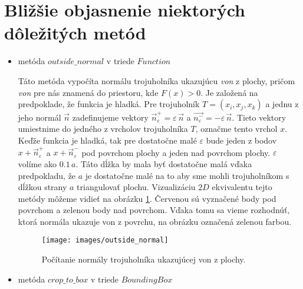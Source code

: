 \section{Bližšie objasnenie niektorých dôležitých metód}
\label{kap:important_methods}
\begin{itemize}
    \item{
        metóda $outside\_normal$ v triede $Function$
        
        Táto metóda vypočíta normálu trojuholníka ukazujúcu \textit{von} z plochy, 
        pričom \textit{von} pre nás znamená do priestoru, kde $F(x)>0$.
        Je založená na predpoklade, že funkcia je hladká. Pre trojuholník
        $T = (x_i, x_j, x_k)$ a jednu z jeho normál $\overrightarrow{n}$
        zadefinujeme vektory $\overrightarrow{n}_{\varepsilon}^+ = \varepsilon \, \overrightarrow{n}$
        a $\overrightarrow{n_{\varepsilon}^-} = - \varepsilon \, \overrightarrow{n}$.
        Tieto vektory umiestnime do jedného z vrcholov trojuholníka $T$, označme tento vrchol $x$.
        Keďže funkcia je hladká, tak pre dostatočne malé $\varepsilon$ bude jeden z
        bodov $x + \overrightarrow{n}_{\varepsilon}^+$ a $x + \overrightarrow{n}_{\varepsilon}^-$ 
        pod povrchom plochy a jeden nad povrchom plochy. 
        $\varepsilon$ volíme ako $0.1 \, a$. Táto dĺžka by mala byť dostatočne malá vďaka predpokladu, 
        že $a$ je dostatočne 
        malé na to aby sme mohli trojuholníkom s dĺžkou strany $a$ triangulovať plochu.
        Vizualizáciu $2D$ ekvivalentu tejto metódy môžeme vidieť na obrázku \ref{obr:outside_normal}.
        Červenou sú vyznačené body pod povrchom a zelenou body nad povrchom. Vďaka tomu sa vieme 
        rozhodnúť, ktorá normála ukazuje von z povrchu, na obrázku označená zelenou farbou.

        \begin{figure}
            \centerline{\texttt{[image: images/outside\_normal]}}
            \caption[Počítanie normály trojuholníka ukazujúcej von z plochy]
            {Počítanie normály trojuholníka ukazujúcej von z plochy.}
            \label{obr:outside_normal}
        \end{figure}
    }
    \item{

        metóda $crop\_to\_box$ v triede $BoundingBox$
        
}
\end{itemize}
